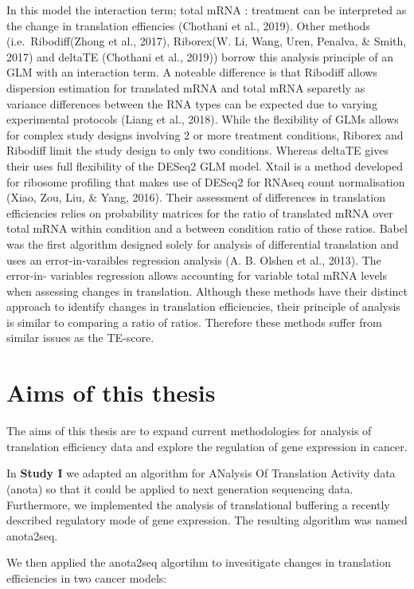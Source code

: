 \documentclass[12pt,openany]{book}
\begin{document}
In this model the interaction term; total mRNA : treatment can be
interpreted as the change in translation effiencies (Chothani et al.,
2019). Other methods (i.e.~Ribodiff(Zhong et al., 2017), Riborex(W. Li,
Wang, Uren, Penalva, \& Smith, 2017) and deltaTE (Chothani et al.,
2019)) borrow this analysis principle of an GLM with an interaction
term. A noteable difference is that Ribodiff allows dispersion
estimation for translated mRNA and total mRNA separetly as variance
differences between the RNA types can be expected due to varying
experimental protocols (Liang et al., 2018). While the flexibility of
GLMs allows for complex study designs involving 2 or more treatment
conditions, Riborex and Ribodiff limit the study design to only two
conditions. Whereas deltaTE gives their uses full flexibility of the
DESeq2 GLM model. Xtail is a method developed for ribosome profiling
that makes use of DESeq2 for RNAseq count normalisation (Xiao, Zou, Liu,
\& Yang, 2016). Their assessment of differences in translation
efficiencies relies on probability matrices for the ratio of translated
mRNA over total mRNA within condition and a between condition ratio of
these ratios. Babel was the first algorithm designed solely for analysis
of differential translation and uses an error-in-varaibles regression
analysis (A. B. Olshen et al., 2013). The error-in- variables regression
allows accounting for variable total mRNA levels when assessing changes
in translation. Although these methods have their distinct approach to
identify changes in translation efficiencies, their principle of
analysis is similar to comparing a ratio of ratios. Therefore these
methods suffer from similar issues as the TE-score.

\chapter{Aims of this thesis}

The aims of this thesis are to expand current methodologies for analysis
of translation efficiency data and explore the regulation of gene
expression in cancer.

In \textbf{Study I} we adapted an algorithm for ANalysis Of Translation
Activity data (anota) so that it could be applied to next generation
sequencing data. Furthermore, we implemented the analysis of
translational buffering a recently described regulatory mode of gene
expression. The resulting algorithm was named anota2seq.

We then applied the anota2seq algortihm to invesitigate changes in
translation efficiencies in two cancer models:
\end{document}
